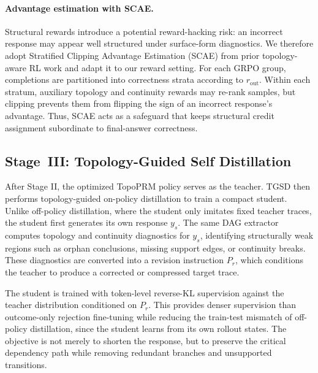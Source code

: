 \paragraph{Advantage estimation with SCAE.}
Structural rewards introduce a potential reward-hacking risk: an incorrect response may appear well structured under surface-form diagnostics. We therefore adopt Stratified Clipping Advantage Estimation (SCAE) from prior topology-aware RL work and adapt it to our reward setting. For each GRPO group, completions are partitioned into correctness strata according to \(r_{\mathrm{out}}\). Within each stratum, auxiliary topology and continuity rewards may re-rank samples, but clipping prevents them from flipping the sign of an incorrect response's advantage. Thus, SCAE acts as a safeguard that keeps structural credit assignment subordinate to final-answer correctness.

\subsection{Stage~III: Topology-Guided Self Distillation}
\label{sec:tgsd}
After Stage II, the optimized TopoPRM policy serves as the teacher. TGSD then performs topology-guided on-policy distillation to train a compact student. Unlike off-policy distillation, where the student only imitates fixed teacher traces, the student first generates its own response \(y_s\). The same DAG extractor computes topology and continuity diagnostics for \(y_s\), identifying structurally weak regions such as orphan conclusions, missing support edges, or continuity breaks. These diagnostics are converted into a revision instruction \(P_r\), which conditions the teacher to produce a corrected or compressed target trace.

The student is trained with token-level reverse-KL supervision against the teacher distribution conditioned on \(P_r\). This provides denser supervision than outcome-only rejection fine-tuning while reducing the train-test mismatch of off-policy distillation, since the student learns from its own rollout states. The objective is not merely to shorten the response, but to preserve the critical dependency path while removing redundant branches and unsupported transitions.



